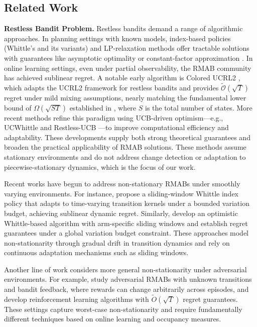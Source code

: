 \documentclass[twoside]{article}
\theoremstyle{plain}
\theoremstyle{definition}
\theoremstyle{remark}
\begin{document}
\subsection{Related Work}
\label{sec:intro:related}
\vspace{-5pt}
\textbf{Restless Bandit Problem.} 
Restless bandits demand a range of algorithmic approaches. 
In planning settings with known models, index-based policies (Whittle’s and its variants) and LP-relaxation methods offer tractable solutions with guarantees like asymptotic optimality or constant-factor approximation \citep{Whittle1988RestlessBA, guha2010approximation}.  
In online learning settings, even under partial observability, the RMAB community has achieved sublinear regret. 
A notable early algorithm is Colored UCRL2 \citep{ortner2012regret}, which adapts the UCRL2 framework for restless bandits and provides $\tilde{\mathcal{O}}(\sqrt{T})$ regret under mild mixing assumptions, nearly matching the fundamental lower bound of $\Omega(\sqrt{ST})$ established in \citep{ortner2012regret}, where $S$ is the total number of states.  
More recent methods refine this paradigm using UCB-driven optimism—e.g., UCWhittle \citep{wang2023optimistic} and Restless-UCB \citep{wang2020restless}—to improve computational efficiency and adaptability. 
These developments supply both strong theoretical guarantees and broaden the practical applicability of RMAB solutions. These methods assume stationary environments and do not address change detection or adaptation to piecewise-stationary dynamics, which is the focus of our work.

Recent works have begun to address non-stationary RMABs under smoothly varying environments. For instance, \citet{shisher2025onlinelearningwhittleindices} propose a sliding-window Whittle index policy that adapts to time-varying transition kernels under a bounded variation budget, achieving sublinear dynamic regret. Similarly, \citet{hung2025nonstationaryrestlessmultiarmedbandits} develop an optimistic Whittle-based algorithm with arm-specific sliding windows and establish regret guarantees under a global variation budget constraint. These approaches model non-stationarity through gradual drift in transition dynamics and rely on continuous adaptation mechanisms such as sliding windows.

Another line of work considers more general non-stationarity under adversarial environments. For example, \citet{xiong2024provablyefficientreinforcementlearning} study adversarial RMABs with unknown transitions and bandit feedback, where rewards can change arbitrarily across episodes, and develop reinforcement learning algorithms with $\tilde{O}(\sqrt{T})$ regret guarantees. These settings capture worst-case non-stationarity and require fundamentally different techniques based on online learning and occupancy measures.
\end{document}
